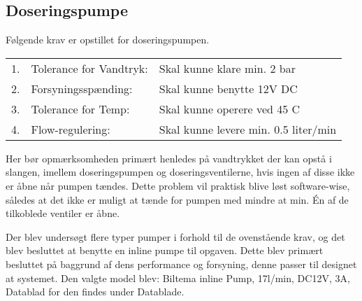 \subsection{Doseringspumpe}
Følgende krav er opstillet for doseringspumpen.  

\begin{table}[h]
	\begin{tabular}{ l l l }
		1. 	& Tolerance for Vandtryk:   	& Skal kunne klare min. 2 bar \\
		2. 	& Forsyningsspænding: 			& Skal kunne benytte 12V DC \\
		3.	& Tolerance for Temp: 			& Skal kunne operere ved 45 C \\
		4.	& Flow-regulering: 				& Skal kunne levere min. 0.5 liter/min
	\end{tabular}
\end{table}

Her bør opmærksomheden primært henledes på vandtrykket der kan opstå i slangen, imellem doseringspumpen og doseringsventilerne, hvis ingen af disse ikke er åbne når pumpen tændes.
Dette problem vil praktisk blive løst software-wise, således at det ikke er muligt at tænde for pumpen med mindre at min. Én af de tilkoblede ventiler er åbne.  

Der blev undersøgt flere typer pumper i forhold til de ovenstående krav, og det blev besluttet at benytte en inline pumpe til opgaven. Dette blev primært besluttet på baggrund af dens performance og forsyning, denne passer til designet at systemet.  
Den valgte model blev: 
Biltema inline Pump, 17l/min, DC12V, 3A, 
Datablad for den findes under Datablade. 
 